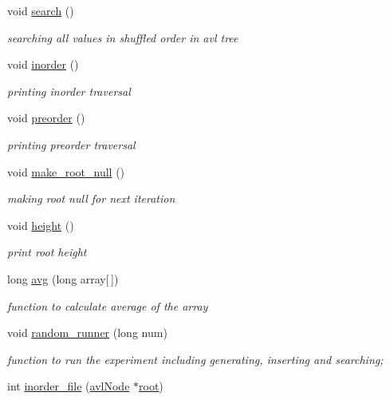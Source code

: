\begin{DoxyCompactItemize}
void \hyperlink{class_a_v_ltree_1_1utility_a3ad33261efae427295a70173916dcdba}{search} ()
\begin{DoxyCompactList}\small\item\em searching all values in shuffled order in avl tree \end{DoxyCompactList}\item 
void \hyperlink{class_a_v_ltree_1_1utility_a745b29a61be790d48f3872cbbcc3200d}{inorder} ()
\begin{DoxyCompactList}\small\item\em printing inorder traversal \end{DoxyCompactList}\item 
void \hyperlink{class_a_v_ltree_1_1utility_a20369b889532ea30b797527cc874d412}{preorder} ()
\begin{DoxyCompactList}\small\item\em printing preorder traversal \end{DoxyCompactList}\item 
void \hyperlink{class_a_v_ltree_1_1utility_a59e048dc2e914e87be6900615aac1499}{make\-\_\-root\-\_\-null} ()
\begin{DoxyCompactList}\small\item\em making root null for next iteration \end{DoxyCompactList}\item 
void \hyperlink{class_a_v_ltree_1_1utility_a052cc2f33fa3068d5cc5db3f91a7540d}{height} ()
\begin{DoxyCompactList}\small\item\em print root height \end{DoxyCompactList}\item 
long \hyperlink{class_a_v_ltree_1_1utility_a10d7bc6a8978e25620e1b235e12bf61b}{avg} (long array\mbox{[}$\,$\mbox{]})
\begin{DoxyCompactList}\small\item\em function to calculate average of the array \end{DoxyCompactList}\item 
void \hyperlink{class_a_v_ltree_1_1utility_aa97cbd19c06e2542eb7aad1f93757957}{random\-\_\-runner} (long num)
\begin{DoxyCompactList}\small\item\em function to run the experiment including generating, inserting and searching; \end{DoxyCompactList}\item 
int \hyperlink{class_a_v_ltree_1_1utility_adfd05cec6e81f1e775f31a52ad76bdc7}{inorder\-\_\-file} (\hyperlink{namespace_a_v_ltree_a563d9b152f0d58a69308eeec8d716882}{avl\-Node} $\ast$\hyperlink{class_a_v_ltree_1_1utility_ad280714781d2107450345a21a1363931}{root})

\end{DoxyCompactItemize}

